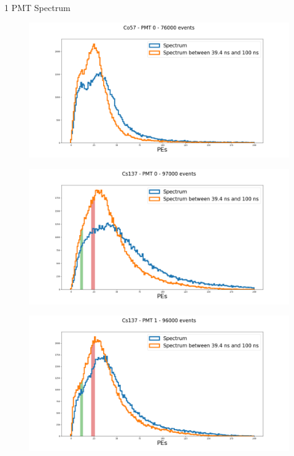 \documentclass{beamer}
\begin{document}
\begin{frame}{1 PMT Spectrum}
\begin{figure}[h]
\includegraphics[width=1\linewidth]{SpecCo0.png}
\end{figure}
\end{frame}

\begin{frame}
\begin{figure}[h]
\includegraphics[width=1\linewidth]{SpecCs0.png}
\end{figure}
\end{frame}

\begin{frame}
\begin{figure}[h]
\includegraphics[width=1\linewidth]{SpecCs1.png}
\end{figure}
\end{frame}
\end{document}
